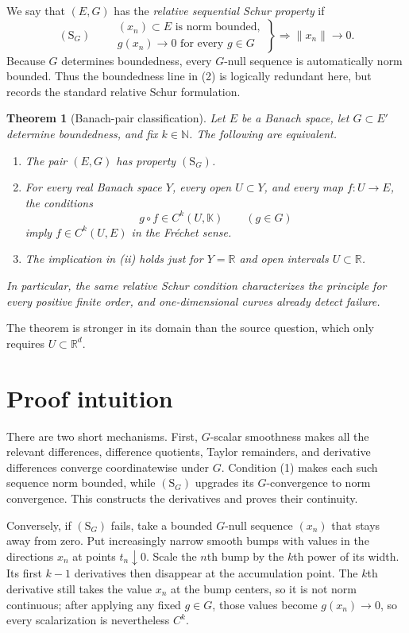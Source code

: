 \documentclass[11pt]{article}
\newtheorem{theorem}{Theorem}
\newcommand{\K}{\mathbb K}
\newcommand{\R}{\mathbb R}
\newcommand{\N}{\mathbb N}
\newcommand{\SG}{(\mathrm{S}_G)}
\begin{document}
We say that $(E,G)$ has the \emph{relative sequential Schur property} if
\[
 \SG\qquad
 \left.
 \begin{array}{c}
 (x_n)\subset E\text{ is norm bounded},\\
 g(x_n)\longrightarrow0\text{ for every }g\in G
 \end{array}
 \right\}
 \Longrightarrow \|x_n\|\longrightarrow0.
 \tag{2}
\]
Because $G$ determines boundedness, every $G$-null sequence is automatically
norm bounded.  Thus the boundedness line in (2) is logically redundant here,
but records the standard relative Schur formulation.

\begin{theorem}[Banach-pair classification]\label{thm:classification}
Let $E$ be a Banach space, let $G\subset E'$ determine boundedness, and fix
$k\in\N$.  The following are equivalent.
\begin{enumerate}
\item[(i)] The pair $(E,G)$ has property $\SG$.
\item[(ii)] For every real Banach space $Y$, every open $U\subset Y$, and every map
      $f:U\to E$, the conditions
      \[
        g\circ f\in C^k(U,\K)\qquad(g\in G)
      \]
      imply $f\in C^k(U,E)$ in the Fr\'echet sense.
\item[(iii)] The implication in (ii) holds just for $Y=\R$ and open intervals
      $U\subset\R$.
\end{enumerate}
In particular, the same relative Schur condition characterizes the principle
for every positive finite order, and one-dimensional curves already detect
failure.
\end{theorem}

The theorem is stronger in its domain than the source question, which only
requires $U\subset\R^d$.

\section{Proof intuition}

There are two short mechanisms.  First, $G$-scalar smoothness makes all the
relevant differences, difference quotients, Taylor remainders, and derivative
differences converge coordinatewise under $G$.  Condition (1) makes each such
sequence norm bounded, while $\SG$ upgrades its $G$-convergence to norm
convergence.  This constructs the derivatives and proves their continuity.

Conversely, if $\SG$ fails, take a bounded $G$-null sequence $(x_n)$ that stays
away from zero.  Put increasingly narrow smooth bumps with values in the
directions $x_n$ at points $t_n\downarrow0$.  Scale the $n$th bump by the
$k$th power of its width.  Its first $k-1$ derivatives then disappear at the
accumulation point.  The $k$th derivative still takes the value $x_n$ at the
bump centers, so it is not norm continuous; after applying any fixed $g\in G$,
those values become $g(x_n)\to0$, so every scalarization is nevertheless
$C^k$.
\end{document}

